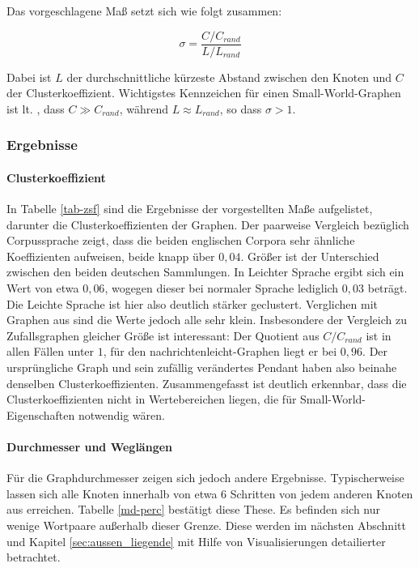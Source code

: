 \documentclass[11pt, a4paper]{article}
\begin{document}
Das vorgeschlagene Maß setzt sich wie folgt zusammen:

$$
\sigma = \frac{C/C_{rand}}{ L/L_{rand}}
$$

Dabei ist $L$ der durchschnittliche kürzeste Abstand zwischen den Knoten und $C$
der Clusterkoeffizient.
Wichtigstes Kennzeichen für einen Small-World-Graphen ist lt. \cite{Humphries2006},
dass $C \gg C_{rand}$, während $L \approx L_{rand}$, so dass $\sigma > 1$.\\


\subsubsection{Ergebnisse}
\paragraph{Clusterkoeffizient}
In Tabelle \ref{tab-zsf} sind die Ergebnisse der vorgestellten Maße aufgelistet, darunter die Clusterkoeffizienten der Graphen.
Der paarweise Vergleich bezüglich Corpussprache zeigt, dass die beiden englischen Corpora sehr ähnliche Koeffizienten aufweisen, beide knapp über $0,04$.
Größer ist der Unterschied zwischen den beiden deutschen Sammlungen.
In Leichter Sprache ergibt sich ein Wert von etwa $0,06$, wogegen dieser bei normaler Sprache lediglich $0,03$ beträgt.
Die Leichte Sprache ist hier also deutlich stärker geclustert.
Verglichen mit Graphen aus \cite[S. 182]{Newman2003} sind die Werte jedoch alle sehr klein.
Insbesondere der Vergleich zu Zufallsgraphen gleicher Größe ist interessant:
Der Quotient aus $C/C_{rand}$ ist in allen Fällen unter $1$, für den nachrichtenleicht-Graphen liegt er bei $0,96$.
Der ursprüngliche Graph und sein zufällig verändertes Pendant haben also beinahe denselben Clusterkoeffizienten.
Zusammengefasst ist deutlich erkennbar, dass die Clusterkoeffizienten nicht in Wertebereichen liegen, die für Small-World-Eigenschaften notwendig wären.

\paragraph{Durchmesser und Weglängen}
Für die Graphdurchmesser zeigen sich jedoch andere Ergebnisse.
Typischerweise lassen sich alle Knoten innerhalb von etwa 6 Schritten von jedem anderen Knoten aus erreichen.
Tabelle \ref{md-perc} bestätigt diese These.
Es befinden sich nur wenige Wortpaare außerhalb dieser Grenze.
Diese werden im nächsten Abschnitt und Kapitel \ref{sec:aussen_liegende} mit Hilfe von Visualisierungen detailierter betrachtet.
\end{document}
